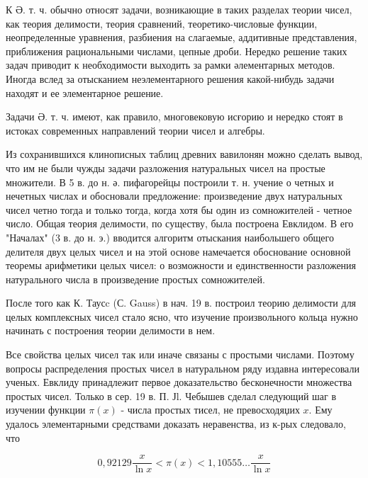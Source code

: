 \documentclass[10pt]{article}
\begin{document}
К Ә. т. ч. обычно относят задачи, возникающие в таких разделах теории чисел, как теория делимости, теория сравнений, теоретико-числовые функции, неопределенные уравнения, разбиения на слагаемые, аддитивные представления, приближения рациональными числами, цепные дроби. Нередко решение таких задач приводит к необходимости выходить за рамки әлементарных методов. Иногда вслед за отысканием неэлементарного решения какой-нибудь задачи находят и ее элементарное решение.



Задачи Ә. т. ч. имеют, как правило, многовековую исғорию и нередко стоят в истоках современных направлений теории чисел и алгебры.



Из сохранившихся клинописных таблиц древних вавилонян можно сделать вывод, что им не были чужды задачи разложения натуральных чисел на простые множители. В 5 в. до н. ә. пифагорейцы построили т. н. учение о четных и нечетных числах и обосновали предложение: произведение двух натуральных чисел четно тогда и только тогда, когда хотя бы один из сомножителей - четное число. Общая теория делимости, по существу, была построена Евклидом. В его "Началах" (3 в. до н. э.) вводится алгоритм отыскания наибольшего общего делителя двух целых чисел и на этой основе намечается обоснование основной теоремы арифметики целых чисел: о возможности и единственности разложения натурального числа в произведение простых сомножителей.



После того как К. Таусc (С. Gauss) в нач. 19 в. построил теорию делимости для целых комплексных чисел стало ясно, что изучение произвольного кольца нужно начинать с построения теории делимости в нем.



Все свойства целых чисел так или иначе связаны с простыми числами. Поэтому вопросы распределения простых чисел в натуральном ряду издавна интересовали ученых. Евклиду принадлежит первое доказательство бесконечности множества простых чисел. Только в сер. 19 в. П. Јl. Чебышев сделал следующий шаг в изучении функции $\pi(x)$ - числа простых тисел, не превосходяџих $x$. Ему удалось элементарными средствами доказать неравенства, из к-рых следовало, что



\[

0,92129 \frac{x}{\ln x}<\pi(x)<1,10555 \ldots \frac{x}{\ln x}

\]
\end{document}
